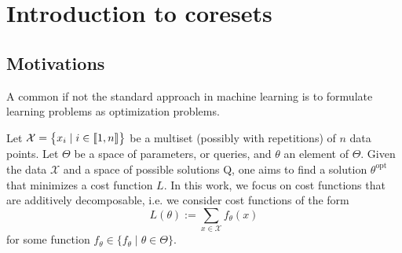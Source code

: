 
\chapter{Introduction to coresets}

\section{Motivations}




A common if not the standard approach in machine learning
is to formulate learning problems as optimization problems.

Let $\mathcal{X}=\begin{Bmatrix}
x_{i} \mid i\in \llbracket 1,n \rrbracket
\end{Bmatrix}$ be a multiset (possibly with repetitions) of $n$ data points. Let $\Theta$ be a space of parameters, or queries, and $\theta$ an element of $\Theta$. Given the data $\mathcal{X}$ and a space of possible solutions Q, one aims to find a solution $\theta^{\text {opt }}$ that minimizes a cost function $L$. In this work, we focus on cost functions that are additively decomposable, i.e. we consider cost functions of the form
\begin{equation*}
L(\theta):=\sum_{x \in \mathcal{X}} f_\theta(x)
\end{equation*}
for some function $f_\theta \in \{f_\theta \mid \theta \in \Theta\}$.

